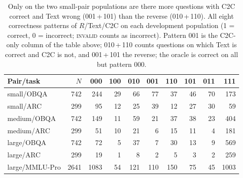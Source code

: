 \begin{table}[h]\centering\footnotesize
\caption{Only on the two small-pair populations are there more questions with C2C correct and Text wrong (001\,+\,101) than the reverse (010\,+\,110). All eight correctness patterns of $R$/Text/C2C on each development population (1 = correct, 0 = incorrect; \textsc{invalid} counts as incorrect). Pattern 001 is the C2C-only column of the table above; 010\,+\,110 counts questions on which Text is correct and C2C is not, and 001\,+\,101 the reverse; the oracle is correct on all but pattern 000.}
\label{tab:patterns}
\begin{tabular}{lrrrrrrrrr}\toprule
Pair/task & $N$ & 000 & 100 & 010 & 001 & 110 & 101 & 011 & 111\\\midrule
small/OBQA & 742 & 244 & 29 & 66 & 77 & 37 & 46 & 70 & 173\\
small/ARC & 299 & 95 & 12 & 25 & 39 & 12 & 27 & 30 & 59\\
medium/OBQA & 742 & 149 & 11 & 59 & 21 & 37 & 38 & 23 & 404\\
medium/ARC & 299 & 51 & 10 & 21 & 6 & 15 & 11 & 4 & 181\\
large/OBQA & 742 & 72 & 5 & 37 & 7 & 30 & 13 & 9 & 569\\
large/ARC & 299 & 19 & 1 & 8 & 2 & 5 & 3 & 2 & 259\\
large/MMLU-Pro & 2641 & 1083 & 54 & 121 & 110 & 150 & 75 & 45 & 1003\\
\bottomrule\end{tabular}
\end{table}
